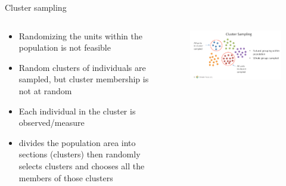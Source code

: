 \documentclass[10pt, compress]{beamer}
\begin{document}
\begin{frame}[t]{Cluster sampling}
    \begin{columns}
        \begin{block}{}
            \begin{itemize}
                \item Randomizing the units within the population is not feasible
                \item Random clusters of individuals are sampled, but cluster membership is not at random
                \item Each individual in the cluster is observed/measure
                \item divides the population area into sections (clusters) then randomly selects clusters and chooses all the members of those clusters
            \end{itemize}
        \end{block}
        \begin{block}{}
            \begin{figure}
                \begin{center}
                    \includegraphics[scale=0.25]{img/Slide5.png}
                \end{center}
            \end{figure}
        \end{block}
    \end{columns}

\end{frame}
\end{document}
